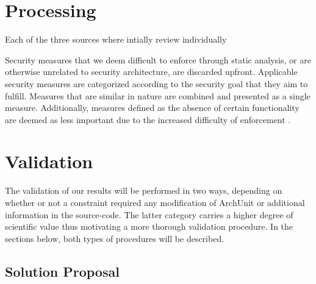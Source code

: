 \section{Processing}

Each of the three sources where intially review individually 


Security measures that we deem difficult to enforce through static analysis, or are otherwise unrelated to security architecture, are discarded upfront. Applicable security measures are categorized according to the security goal that they aim to fulfill. Measures that are similar in nature are combined and presented as a single measure. Additionally, measures defined as the absence of certain functionality are deemed as less important due to the increased difficulty of enforcement \cite{haley_security_2008}. 



\section{Validation}

The validation of our results will be performed in two ways, depending on whether or not a constraint required any modification of ArchUnit or additional information in the source-code. The latter category carries a higher degree of scientific value thus motivating a more thorough validation procedure. In the sections below, both types of procedures will be described. 

\subsection{Solution Proposal}

